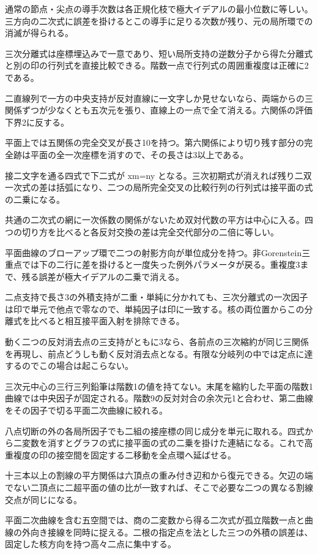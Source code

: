 \documentclass[11pt,a4paper]{ltjsarticle}
\begin{document}
通常の節点・尖点の導手次数は各正規化枝で極大イデアルの最小位数に等しい。三方向の二次式に誤差を掛けるとこの導手に足りる次数が残り、元の局所環での消滅が得られる。

三次分離式は座標埋込みで一意であり、短い局所支持の逆数分子から得た分離式と別の印の行列式を直接比較できる。階数一点で行列式の周囲重複度は正確に2である。

二直線列で一方の中央支持が反対直線に一文字しか見せないなら、両端からの三関係ずつが少なくとも五次元を張り、直線上の一点で全て消える。六関係の評価下界2に反する。

平面上では五関係の完全交叉が長さ10を持つ。第六関係により切り残す部分の完全跡は平面の全一次座標を消すので、その長さは3以上である。

接二文字を通る四式で下二式が xm=ny となる。三次初期式が消えれば残り二双一次式の差は括弧になり、二つの局所完全交叉の比較行列の行列式は接平面の式の二乗になる。

共通の二次式の網に一次係数の関係がないため双対代数の平方は中心に入る。四つの切り方を比べると各反対交換の差は完全交代部分の二倍に等しい。

平面曲線のブローアップ環で二つの射影方向が単位成分を持つ。非Gorenstein三重点では下の二行に差を掛けると一度失った例外パラメータが戻る。重複度3まで、残る誤差が極大イデアルの二乗で消える。

二点支持で長さ3の外積支持が二重・単純に分かれても、三次分離式の一次因子は印で単元で他点で零なので、単純因子は印に一致する。核の両位置からこの分離式を比べると相互接平面入射を排除できる。

動く二つの反対消去点の三支持がともに3なら、各前点の三次縮約が同じ三関係を再現し、前点どうしも動く反対消去点となる。有限な分岐列の中では定点に達するのでこの場合は起こらない。

三次元中心の三行三列鉛筆は階数1の値を持てない。末尾を縮約した平面の階数1曲線では中央因子が固定される。階数9の反対対合の余次元1と合わせ、第二曲線をその因子で切る平面二次曲線に絞れる。

八点切断の外の各局所因子でも二組の接座標の同じ成分を単元に取れる。四式から二変数を消すとグラフの式に接平面の式の二乗を掛けた連結になる。これで高重複度の印の接空間を固定する二移動を全点環へ延ばせる。

十三本以上の割線の平方関係は六頂点の重み付き辺和から復元できる。欠辺の端でない二頂点に二超平面の値の比が一致すれば、そこで必要な二つの異なる割線交点が同じになる。

平面二次曲線を含む五空間では、商の二変数から得る二次式が孤立階数一点と曲線の外向き接線を同時に捉える。二根の指定点を法とした三つの外積の誤差は、固定した核方向を持つ高々二点に集中する。
\end{document}
